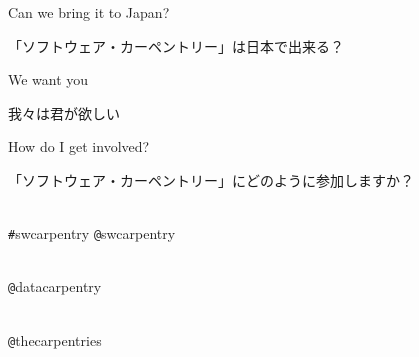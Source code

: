 \documentclass{beamer}
\begin{document}
  \begin{frame}
   
   \begin{center}
   
   \LARGE{Can we bring it to Japan?}\\
   \LARGE{\begin{CJK}{UTF8}{min}「ソフトウェア・カーペントリー」は日本で出来る？\end{CJK}}
   
   
   \begin{center}
  \end{center}
   \end{center}

  \end{frame}
   \begin{frame}

\begin{center}
      
      \Large{We want you} \\ \begin{CJK}{UTF8}{min}\Large{我々は君が欲しい}\end{CJK}
  \end{center}

\end{frame}
  \begin{frame}
   
   \begin{center}
   
   \LARGE{How do I get involved?}\\
   \LARGE{\begin{CJK}{UTF8}{min}「ソフトウェア・カーペントリー」にどのように参加しますか？\end{CJK}}
   
   \begin{center}
  \end{center}
   \end{center}

  \end{frame}
  \begin{frame}

 \begin{center}
\\    \texttt{\#}swcarpentry \texttt{@}swcarpentry   
\bigskip
      
      \\ \texttt{@}datacarpentry   
\bigskip
       
       
      
       \\ \texttt{@}thecarpentries   
 \end{center}
  
\end{frame}    
\end{document}
